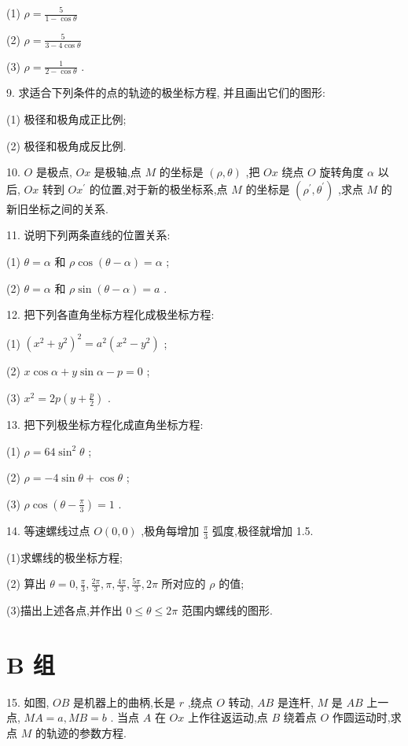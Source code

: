 \documentclass[lang=cn,newtx,10.5pt,scheme=chinese]{elegantbook}
\begin{document}
(1) \(\rho = \frac{5}{1 - \cos \theta }\)

(2) \(\rho = \frac{5}{3 - 4\cos \theta }\)

(3) \(\rho = \frac{1}{2 - \cos \theta }\) .

9. 求适合下列条件的点的轨迹的极坐标方程, 并且画出它们的图形:

(1) 极径和极角成正比例;

(2) 极径和极角成反比例.

10. \(O\) 是极点, \({Ox}\) 是极轴,点 \(M\) 的坐标是 \(\left( {\rho ,\theta }\right)\) ,把 \({Ox}\) 绕点 \(O\) 旋转角度 \(\alpha\) 以后, \({Ox}\) 转到 \(O{x}^{\prime }\) 的位置,对于新的极坐标系,点 \(M\) 的坐标是 \(\left( {{\rho }^{\prime },{\theta }^{\prime }}\right)\) ,求点 \(M\) 的新旧坐标之间的关系.

11. 说明下列两条直线的位置关系:

(1) \(\theta = \alpha\) 和 \(\rho \cos \left( {\theta - \alpha }\right) = \alpha\) ;

(2) \(\theta = \alpha\) 和 \(\rho \sin \left( {\theta - \alpha }\right) = a\) .

12. 把下列各直角坐标方程化成极坐标方程:

(1) \({\left( {x}^{2} + {y}^{2}\right) }^{2} = {a}^{2}\left( {{x}^{2} - {y}^{2}}\right)\) ;

(2) \(x\cos \alpha + y\sin \alpha - p = 0\) ;

(3) \({x}^{2} = {2p}\left( {y + \frac{p}{2}}\right)\) .

13. 把下列极坐标方程化成直角坐标方程:

(1) \(\rho = {64}{\sin }^{2}\theta\) ;

(2) \(\rho = - 4\sin \theta + \cos \theta\) ;

(3) \(\rho \cos \left( {\theta - \frac{\pi }{3}}\right) = 1\) .

14. 等速螺线过点 \(O\left( {0,0}\right)\) ,极角每增加 \(\frac{\pi }{3}\) 弧度,极径就增加 1.5.

(1)求螺线的极坐标方程;

(2) 算出 \(\theta = 0,\frac{\pi }{3},\frac{2\pi }{3},\pi ,\frac{4\pi }{3},\frac{5\pi }{3},{2\pi }\) 所对应的 \(\rho\) 的值;

(3)描出上述各点,并作出 \(0 \leq \theta \leq {2\pi }\) 范围内螺线的图形.

\section*{B 组}

15. 如图, \({OB}\) 是机器上的曲柄,长是 \(r\) ,绕点 \(O\) 转动, \({AB}\) 是连杆, \(M\) 是 \({AB}\) 上一点, \({MA} = a,{MB} = b\) . 当点 \(A\) 在 \({Ox}\) 上作往返运动,点 \(B\) 绕着点 \(O\) 作圆运动时,求点 \(M\) 的轨迹的参数方程.
\end{document}
